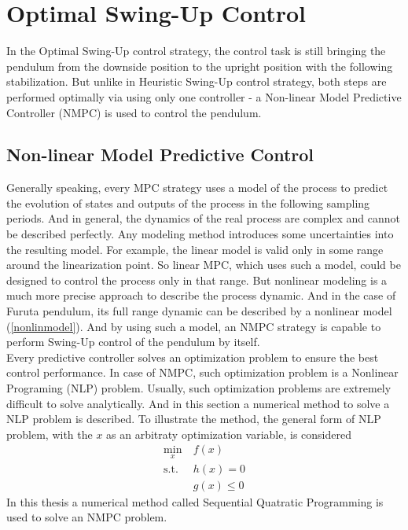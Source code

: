 \section{Optimal Swing-Up Control}\label{nmpcsection}
In the Optimal Swing-Up control strategy, the control task is still bringing the pendulum from the downside position to the upright position with the following stabilization. But unlike in Heuristic Swing-Up control strategy, both steps are performed optimally via using only one controller - a Non-linear Model Predictive Controller (NMPC) is used to control the pendulum.\\
\subsection{Non-linear Model Predictive Control}
Generally speaking, every MPC strategy uses a model of the process to predict the evolution of states and outputs of the process in the following sampling periods. And in general, the dynamics of the real process are complex and cannot be described perfectly. Any modeling method introduces some uncertainties into the resulting model. For example, the linear model is valid only in some range around the linearization point. So linear MPC, which uses such a model, could be designed to control the process only in that range. But nonlinear modeling is a much more precise approach to describe the process dynamic. And in the case of Furuta pendulum, its full range dynamic can be described by a nonlinear model (\ref{nonlinmodel}). And by using such a model, an NMPC strategy is capable to perform Swing-Up control of the pendulum by itself.\\
Every predictive controller solves an optimization problem to ensure the best control performance. In case of NMPC, such optimization problem is a Nonlinear Programing (NLP) problem. Usually, such optimization problems are extremely difficult to solve analytically. And in this section a numerical method to solve a NLP problem is described. To illustrate the method, the general form of NLP problem, with the $x$ as an arbitraty optimization variable, is considered
\begin{subequations}\label{nlpgeneral}
	\begin{align}
	\min_{x}\  &f(x)\label{nlp:obj}\\
	\text{s.t.}\  &h(x) = 0\label{nlp:eq}\\
		 &g(x)\leq 0\label{nlp:ineq}
	\end{align}
\end{subequations}
In this thesis a numerical method called Sequential Quatratic Programming is used to solve an NMPC problem. 
